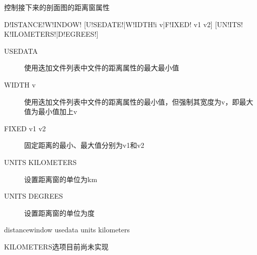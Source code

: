 \label{sss:distancewindow}

控制接下来的剖面图的距离窗属性

\begin{SACSTX}
D!ISTANCE!W!INDOW! [U!SEDATE!|W!IDTH!i v|F!IXED! v1 v2]
    [UN!ITS! K!ILOMETERS!|D!EGREES!]
\end{SACSTX}

\begin{description}
\item [USEDATA] 使用迭加文件列表中文件的距离属性的最大最小值
\item [WIDTH v] 使用迭加文件列表中文件的距离属性的最小值，但强制其宽度为v，即最大值为最小值加上v
\item [FIXED v1 v2] 固定距离的最小、最大值分别为v1和v2
\item [UNITS KILOMETERS] 设置距离窗的单位为km
\item [UNITS DEGREES] 设置距离窗的单位为度
\end{description}

\begin{SACDFT}
distancewindow usedata units kilometers
\end{SACDFT}

KILOMETERS选项目前尚未实现


